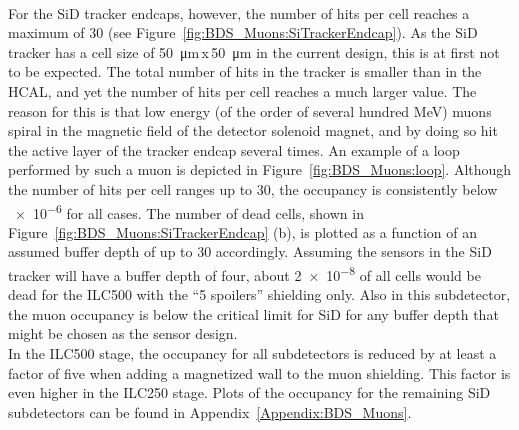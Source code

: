 \\For the SiD tracker endcaps, however, the number of hits per cell reaches a maximum of 30 (see Figure~\ref{fig:BDS_Muons:SiTrackerEndcap}).
As the SiD tracker has a cell size of \SI{50}{\micro\meter}\,x\,\SI{50}{\micro\meter} in the current design, this is at first not to be expected.
The total number of hits in the tracker is smaller than in the HCAL, and yet the number of hits per cell reaches a much larger value.
The reason for this is that low energy (of the order of several hundred MeV) muons spiral in the magnetic field of the detector solenoid magnet, and by doing so hit the active layer of the tracker endcap several times.
An example of a loop performed by such a muon is depicted in Figure~\ref{fig:BDS_Muons:loop}.
Although the number of hits per cell ranges up to 30, the occupancy is consistently below \num{e-6} for all cases.
The number of dead cells, shown in Figure~\ref{fig:BDS_Muons:SiTrackerEndcap} (b), is plotted as a function of an assumed buffer depth of up to 30 accordingly.
Assuming the sensors in the SiD tracker will have a buffer depth of four, about \num{2e-8} of all cells would be dead for the ILC500 with the ``5 spoilers'' shielding only.
Also in this subdetector, the muon occupancy is below the critical limit for SiD for any buffer depth that might be chosen as the sensor design.
\\In the ILC500 stage, the occupancy for all subdetectors is reduced by at least a factor of five when adding a magnetized wall to the muon shielding.
This factor is even higher in the ILC250 stage.
Plots of the occupancy for the remaining SiD subdetectors can be found in Appendix~\ref{Appendix:BDS_Muons}.
